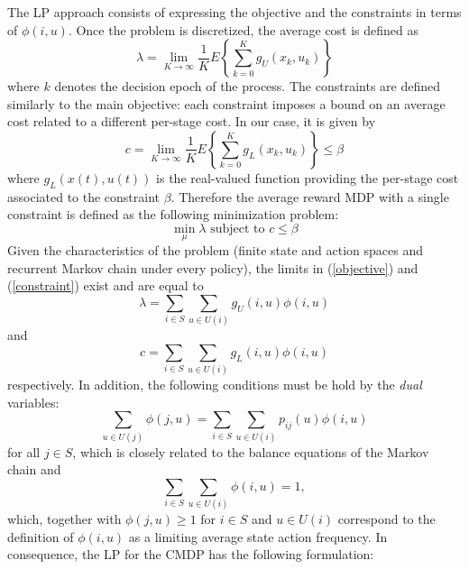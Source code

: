 The LP approach consists of expressing the objective and the constraints in terms of $\phi\left(i,u\right)$. Once the problem is discretized, the average cost is defined as
\begin{equation}\label{objective}
\lambda = \lim_{K\rightarrow\infty}\frac{1}{K}
E\left\{\sum^{K}_{k=0}g_{U}\left(x_{k},u_{k}\right)\right\}
\end{equation}
where $k$ denotes the decision epoch of the process.
The constraints are defined similarly to the main objective: each constraint imposes a bound on an average cost related to a different per-stage cost. In our case, it is given by
\begin{equation}\label{constraint}
c = \lim_{K\rightarrow\infty}\frac{1}{K}
E\left\{\sum^{K}_{k=0}g_{L}\left(x_{k},u_{k}\right)\right\} \leq \beta
\end{equation}
where $g_{L}\left(x(t),u(t)\right)$ is the real-valued function providing the per-stage cost associated to the constraint $\beta$. Therefore the average reward MDP with a single constraint is defined as the following minimization problem:
\begin{equation}
\min_{\mu} \lambda \text{ subject to } c \leq \beta
\end{equation}
Given the characteristics of the problem (finite state and action spaces and recurrent Markov chain under every policy), the limits in (\ref{objective}) and (\ref{constraint}) exist and are equal to
\begin{equation}
\lambda = \displaystyle\sum_{i\in S}\displaystyle\sum_{u\in U(i)}g_{U}\left(i,u\right)\phi\left(i,u\right)
\end{equation}
and
\begin{equation}
c = \displaystyle\sum_{i\in S}\displaystyle\sum_{u\in U(i)}g_{L}\left(i,u\right)\phi\left(i,u\right)
\end{equation}
respectively. In addition, the following conditions must be hold by the \textit{dual} variables:
\begin{equation}
\displaystyle\sum_{u\in U(j)}\phi\left(j,u\right) = \displaystyle\sum_{i\in S}\displaystyle\sum_{u\in U(i)}p_{ij}\left(u\right)\phi\left(i,u\right)
\end{equation}
for all $j \in S$, which is closely related to the balance equations of the Markov chain and
\begin{equation}
\displaystyle\sum_{i\in S}\displaystyle\sum_{u\in U(i)}\phi\left(i,u\right) = 1,
\end{equation}
which, together with $\phi\left(j,u\right) \geq 1$ for $i \in S$ and $u \in U(i)$ correspond to the definition of $\phi\left(i,u\right)$ as a limiting average state action frequency. In consequence, the LP for the CMDP has the following formulation:
